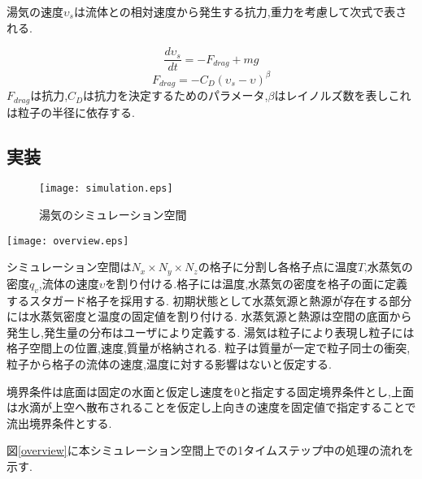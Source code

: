 湯気の速度$\upsilon_{s}$は流体との相対速度から発生する抗力,重力を考慮して次式で表される.

\begin{equation}
\label{lagurange}
\frac{d\upsilon_{s}}{dt} = - F_{drag} + mg
\end{equation}
\begin{equation}
\label{dragforce}
F_{drag} = - C_{D} (\upsilon_{s} - \upsilon)^\beta
\end{equation}
$F_{drag}$は抗力,$C_{D}$は抗力を決定するためのパラメータ,$\beta$はレイノルズ数を表しこれは粒子の半径に依存する.

\subsection{実装}

\begin{figure}[h]
\texttt{[image: simulation.eps]}
\caption{湯気のシミュレーション空間}
\label{simulation}
\end{figure}

\begin{figure*}[h]
\centering
\texttt{[image: overview.eps]}
\caption{提案法の概要}
\label{overview}
\end{figure*}

シミュレーション空間は$N_{x} \times N_{y} \times N_{z}$の格子に分割し各格子点に温度$T$,水蒸気の密度$q_{v}$,流体の速度$\upsilon$を割り付ける.格子には温度,水蒸気の密度を格子の面に定義するスタガード格子を採用する.
初期状態として水蒸気源と熱源が存在する部分には水蒸気密度と温度の固定値を割り付ける.
水蒸気源と熱源は空間の底面から発生し,発生量の分布はユーザにより定義する.
湯気は粒子により表現し粒子には格子空間上の位置,速度,質量が格納される.
粒子は質量が一定で粒子同士の衝突,粒子から格子の流体の速度,温度に対する影響はないと仮定する.

境界条件は底面は固定の水面と仮定し速度を0と指定する固定境界条件とし,上面は水滴が上空へ散布されることを仮定し上向きの速度を固定値で指定することで流出境界条件とする.

図\ref{overview}に本シミュレーション空間上での1タイムステップ中の処理の流れを示す.

